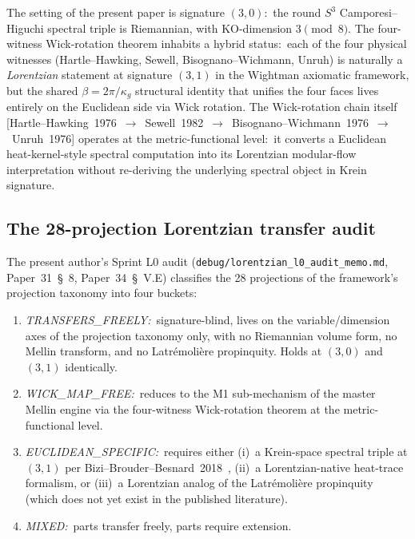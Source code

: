 \documentclass[11pt,a4paper]{article}
\theoremstyle{plain}
\theoremstyle{definition}
\newcommand{\sthree}{S^{3}}
\begin{document}
The setting of the present paper is signature $(3, 0)$:\ the round
$\sthree$ Camporesi--Higuchi spectral triple is Riemannian, with
KO-dimension $3 \pmod 8$. The four-witness Wick-rotation theorem
inhabits a hybrid status:\ each of the four physical witnesses
(Hartle--Hawking, Sewell, Bisognano--Wichmann, Unruh) is naturally a
\emph{Lorentzian} statement at signature $(3, 1)$ in the Wightman
axiomatic framework, but the shared $\beta = 2\pi / \kappa_g$ structural
identity that unifies the four faces lives entirely on the Euclidean
side via Wick rotation. The Wick-rotation chain itself
[Hartle--Hawking~1976~$\to$~Sewell~1982~$\to$~Bisognano--Wichmann~1976~$\to$~Unruh~1976]
operates at the metric-functional level:\ it converts a Euclidean
heat-kernel-style spectral computation into its Lorentzian
modular-flow interpretation without re-deriving the underlying
spectral object in Krein signature.

\subsection{The 28-projection Lorentzian transfer audit}
\label{sec:l0_audit}

The present author's Sprint L0 audit
(\texttt{debug/lorentzian\_l0\_audit\_memo.md}, Paper~31~\S~8,
Paper~34~\S~V.E) classifies the 28 projections of the framework's
projection taxonomy into four buckets:
\begin{enumerate}\setlength{\itemsep}{2pt}
\item[(T)] \emph{TRANSFERS\_FREELY:}\ signature-blind, lives on the
variable/dimension axes of the projection taxonomy only, with no
Riemannian volume form, no Mellin transform, and no Latr\'emoli\`ere
propinquity. Holds at $(3, 0)$ and $(3, 1)$ identically.
\item[(W)] \emph{WICK\_MAP\_FREE:}\ reduces to the M1 sub-mechanism
of the master Mellin engine via the four-witness Wick-rotation theorem
at the metric-functional level.
\item[(E)] \emph{EUCLIDEAN\_SPECIFIC:}\ requires either (i)~a
Krein-space spectral triple at $(3, 1)$ per
Bizi--Brouder--Besnard~2018~\cite{bizi_brouder_besnard2018}, (ii)~a
Lorentzian-native heat-trace formalism, or (iii)~a Lorentzian
analog of the Latr\'emoli\`ere propinquity (which does not yet exist
in the published literature).
\item[(M)] \emph{MIXED:}\ parts transfer freely, parts require
extension.
\end{enumerate}
\end{document}
